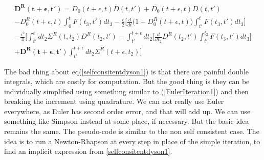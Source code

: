 \documentclass{amsart}
\begin{document}
    
    
        \begin{multline}\label{selfconsitentdyson1}
            \mathbf{D^R(t+\epsilon , t')} = D_0(t+\epsilon , t)\overline{D}(t , t')+\overline{D_0}(t+\epsilon , t)D(t , t')
        \\  -D_0^R(t+\epsilon, t)\int^{t}_{0}F(t_3,t')dt_3 -\frac{\epsilon}{2} \Big[\frac{d}{dt} \Big(1+D_0^R(t+\epsilon,t)\Big)\int^{t}_{t'} F(t_3,t')dt_3 ]\\ -\frac{\epsilon^2}{4} 
            \Big[ \int^{t}_{t'} dt_2  \Sigma^R (t,t_2) D^R(t_2, t')
            -\int^{t+\epsilon}_{t'} dt_2 \big[\frac{d}{dt_2} D^R(t_2 ,t')\int^{t_2}_{t'} F(t_3,t')dt_3\big]
            \\+  \mathbf{D^R(t+\epsilon, t')}\int^{t+\epsilon}_{t'} dt_2  \Sigma^R (t+\epsilon,t_2)\Big]
        \end{multline}
        
    The bad thing about eq(\ref{selfconsitentdyson1}) is that there are painful double integrals, which are costly for computation. But the good thing is they can be individually simplified using something similar to (\ref{EulerIteration1}) and then breaking the increment using quadrature.
    We can not really use Euler everywhere, as Euler has second order error, and that will add up. We can use something like Simpson instead at some place, if necessary. But the basic idea remains the same.    
    The pseudo-code is similar to the non self consistent case. The idea is to run a Newton-Rhapson at every step in place of the simple iteration, to find an implicit expression from \ref{selfconsitentdyson1}.
    
\end{document}
